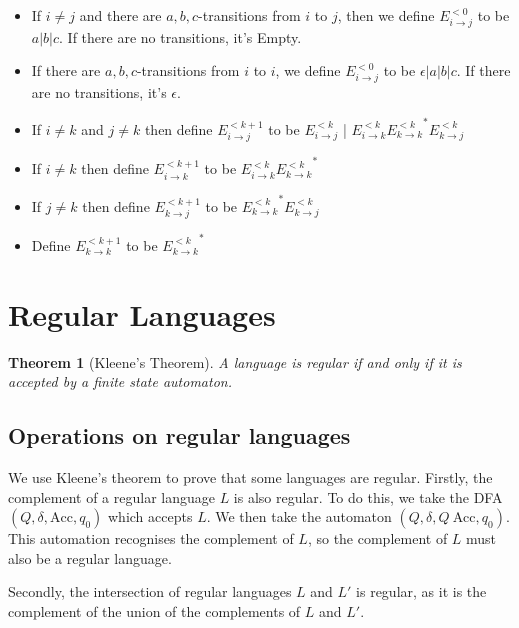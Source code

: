 \documentclass[11pt]{article}
\newtheorem{theorem}{Theorem}
\begin{document}
	\begin{itemize}
		\item If $i \neq j$ and there are $a, b, c$-transitions from $i$ to $j$, then we define $E^{<0}_{i \rightarrow j}$ to be $a|b|c$. If there are no transitions, it's Empty.
		\item If there are $a, b, c$-transitions from $i$ to $i$, we define $E^{<0}_{i \rightarrow j}$ to be $\epsilon|a|b|c$. If there are no transitions, it's $\epsilon$.
		
		\item If $i \neq k$ and $j \neq k$ then define $E^{<k+1}_{i \rightarrow j}$ to be $E^{<k}_{i \rightarrow j}$ | $E^{<k}_{i \rightarrow k} {E^{<k}_{k \rightarrow k}}^{*} E^{<k}_{k \rightarrow j}$
		
		\item If $i \neq k$ then define $E^{<k+1}_{i \rightarrow k}$ to be $E^{<k}_{i \rightarrow k} {E^{<k}_{k \rightarrow k}}^{*}$
		
		\item If $j \neq k$ then define $E^{<k+1}_{k \rightarrow j}$ to be ${E^{<k}_{k \rightarrow k}}^{*} E^{<k}_{k \rightarrow j}$
		
		\item Define $E^{<k+1}_{k \rightarrow k}$ to be ${E^{<k}_{k \rightarrow k}}^{*}$
	\end{itemize}
	
	\section{Regular Languages}
	\begin{theorem}[Kleene's Theorem]
	A language is regular if and only if it is accepted by a finite state automaton.
	\end{theorem}
	 
	\subsection{Operations on regular languages}
	We use Kleene's theorem to prove that some languages are regular. Firstly, the complement of a regular language $L$ is also regular. To do this, we take the DFA $(Q, \delta, \text{Acc}, q_{0})$ which accepts $L$. We then take the automaton $(Q, \delta, Q\ \text{Acc}, q_{0})$. This automation recognises the complement of $L$, so the complement of $L$ must also be a regular language.
	
	\par 
	Secondly, the intersection of regular languages $L$ and $L'$ is regular, as it is the complement of the union of the complements of $L$ and $L'$.
	
\end{document}
